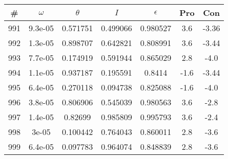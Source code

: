 \begin{table}
\begin{tabular}{c|c|c|c|c|c|c}
\# & $\omega$ & $\theta$ & $I$ & $\epsilon$ & Pro & Con\\
\hline
991 & 9.3e-05 & 0.571751 & 0.499066 & 0.980527 & 3.6 & -3.36\\
992 & 1.3e-05 & 0.898707 & 0.642821 & 0.808991 & 3.6 & -3.44\\
993 & 7.7e-05 & 0.174919 & 0.591944 & 0.865029 & 2.8 & -4.0\\
994 & 1.1e-05 & 0.937187 & 0.195591 & 0.8414 & -1.6 & -3.44\\
995 & 6.4e-05 & 0.270118 & 0.094738 & 0.825088 & -1.6 & -4.0\\
996 & 3.8e-05 & 0.806906 & 0.545039 & 0.980563 & 3.6 & -2.8\\
997 & 1.4e-05 & 0.82699 & 0.985809 & 0.995793 & 3.6 & -2.4\\
998 & 3e-05 & 0.100442 & 0.764043 & 0.860011 & 2.8 & -3.6\\
999 & 6.4e-05 & 0.097783 & 0.964074 & 0.848839 & 2.8 & -3.6\\
\end{tabular}
\end{table}